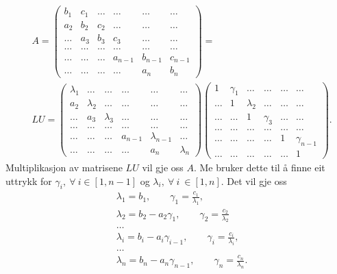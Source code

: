 \documentclass[11pt, a4paper]{article}
\begin{document}
    \begin{align*}
      &A =
      \begin{pmatrix}
        b_1 & c_1 & \dots & \dots & \dots & \dots \\
        a_2 & b_2 & c_2 & \dots & \dots & \dots \\
        \dots & a_3 & b_3 & c_3 & \dots & \dots \\
        \dots & \dots & \dots & \dots & \dots & \dots \\
        \dots & \dots & \dots & a_{n-1} & b_{n-1} & c_{n-1} \\
        \dots & \dots & \dots & \dots & a_n & b_n
      \end{pmatrix} = \\
      &LU =
      \begin{pmatrix}
        \lambda_1 & \dots & \dots & \dots & \dots & \dots \\
        a_2 & \lambda_2 & \dots & \dots & \dots & \dots \\
        \dots & a_3 & \lambda_3 & \dots & \dots & \dots \\
        \dots & \dots & \dots & \dots & \dots & \dots \\
        \dots & \dots & \dots & a_{n-1} & \lambda_{n-1} & \dots \\
        \dots & \dots & \dots & \dots & a_n & \lambda_n 
      \end{pmatrix}
      \begin{pmatrix}
        1 & \gamma_1  & \dots & \dots & \dots & \dots \\
        \dots & 1 & \lambda_2 & \dots & \dots & \dots \\
        \dots & \dots & 1 & \gamma_3 & \dots & \dots \\
        \dots & \dots & \dots & \dots & \dots & \dots \\
        \dots & \dots & \dots & \dots & 1 & \gamma_{n-1} \\
        \dots & \dots & \dots & \dots & \dots & 1 
      \end{pmatrix}.
    \end{align*}
    Multiplikasjon av matrisene $LU$ vil gje oss $A$. Me bruker dette til å finne eit uttrykk for 
    $\gamma_i, \ \forall \ i \in [1, n-1]$ og $\lambda_i, \ \forall \ i \ \in [1, n]$. Det vil gje oss
    \begin{align*}
      &\lambda_1 = b_1, \qquad \gamma_1 = \frac{c_1}{\lambda_1}, \\
      &\lambda_2 = b_2 - a_2\gamma_1, \qquad \gamma_2 = \frac{c_2}{\lambda_2} \\ 
      &\dots \\
      &\lambda_i = b_i - a_i\gamma_{i-1}, \qquad \gamma_i = \frac{c_i}{\lambda_{i}}, \\
      &\dots \\
      &\lambda_n = b_n - a_n\gamma_{n-1}, \qquad \gamma_n = \frac{c_n}{\lambda_n}.
    \end{align*}
\end{document}
